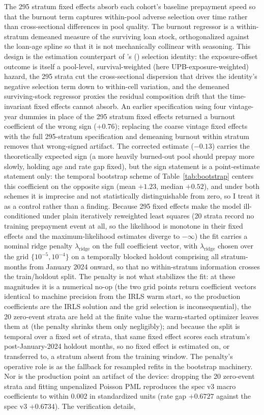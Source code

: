\documentclass[12pt]{article}
\newcommand{\citepos}[1]{\citeauthor{#1}'s (\citeyear{#1})}
\begin{document}
The 295 stratum fixed effects  absorb each cohort's baseline prepayment speed so that the burnout term captures within-pool adverse selection over time rather than cross-sectional differences in pool quality. The burnout regressor is a within-stratum demeaned measure of the surviving loan stock, orthogonalized against the loan-age spline so that it is not mechanically collinear with seasoning. This design is the estimation counterpart of \citepos{lesniewski2026} selection identity: the exposure-offset outcome is itself a pool-level, survival-weighted (here UPB-exposure-weighted) hazard, the 295 strata cut the cross-sectional dispersion that drives the identity's negative selection term down to within-cell variation, and the demeaned surviving-stock regressor proxies the residual composition drift that the time-invariant fixed effects cannot absorb. An earlier specification using four vintage-year dummies in place of the 295 stratum fixed effects returned a burnout coefficient of the wrong sign (+0.76); replacing the coarse vintage fixed effects with the full 295-stratum specification and demeaning burnout within stratum removes that wrong-signed artifact. The corrected estimate ($-0.13$) carries the theoretically expected sign (a more heavily burned-out pool should prepay more slowly, holding age and rate gap fixed), but the sign statement is a point-estimate statement only: the temporal bootstrap scheme of Table~\ref{tab:bootstrap} centers this coefficient on the opposite sign (mean $+1.23$, median $+0.52$), and under both schemes it is imprecise and not statistically distinguishable from zero, so I treat it as a control rather than a finding. Because 295 fixed effects make the model ill-conditioned under plain iteratively reweighted least squares (20 strata record no training prepayment event at all, so the likelihood is monotone in their fixed effects and the maximum-likelihood estimates diverge to $-\infty$) the fit carries a nominal ridge penalty $\lambda_{\mathrm{ridge}}$ on the full coefficient vector, with $\lambda_{\mathrm{ridge}}$ chosen over the grid $\{10^{-5}, 10^{-4}\}$ on a temporally blocked holdout comprising all stratum-months from January 2024 onward, so that no within-stratum information crosses the train/holdout split. The penalty is not what stabilizes the fit: at these magnitudes it is a numerical no-op (the two grid points return coefficient vectors identical to machine precision from the IRLS warm start, so the production coefficients are the IRLS solution and the grid selection is inconsequential), the 20 zero-event strata are held at the finite value the warm-started optimizer leaves them at (the penalty shrinks them only negligibly); and because the split is temporal over a fixed set of strata, that same fixed effect scores each stratum's post-January-2024 holdout months, so no fixed effect is estimated on, or transferred to, a stratum absent from the training window. The penalty's operative role is as the fallback for resampled refits in the bootstrap machinery. Nor is the production point an artifact of the device: dropping the 20 zero-event strata and fitting unpenalized Poisson PML reproduces the spec v3 macro coefficients to within $0.002$ in standardized units (rate gap $+0.6727$ against the spec v3 $+0.6734$). The verification details, 
\end{document}
